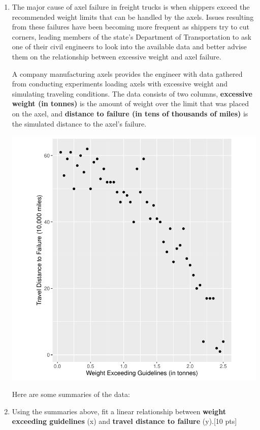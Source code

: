 \documentclass[11pt]{article}\usepackage[]{graphicx}\usepackage[]{color}
\begin{document}
\begin{enumerate}
\item
The major cause of axel failure in freight trucks is when shippers exceed the recommended weight limits that can be handled by the axels. 
Issues resulting from these failures have been becoming more frequent as shippers try to cut corners, 
leading members of the state's Department of Transportation to ask one of their civil engineers 
to look into the available data and better advise them on the relationship between excessive weight and axel failure.

A company manufacturing axels provides the engineer with data gathered from conducting experiments loading axels with excessive weight and simulating traveling conditions.
The data consists of two columns, \textbf{excessive weight (in tonnes)} is the amount of weight over the limit that was placed on the axel, and 
\textbf{distance to failure (in tens of thousands of miles)} is the simulated distance to the axel's failure. 


\begin{center}
\includegraphics{stat305-hw4-sol-002}
\end{center}

Here are some summaries of the data:

       \item  Using the summaries above, fit a linear relationship between \textbf{weight exceeding guidelines} (x) and \textbf{travel distance to failure} (y).[10 pts]
       

\end{enumerate}
\end{document}
